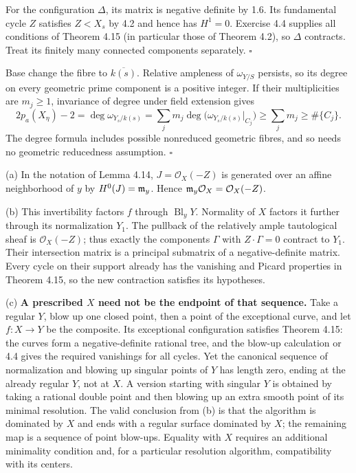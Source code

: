 \documentclass[11pt]{article}
\let\chapterexercise\exercise
\renewcommand{\exercise}[2]{\Needspace{8\baselineskip}\chapterexercise{#1}{#2}}
\begin{document}
For the configuration $\Delta$, its matrix is negative definite by 1.6. Its fundamental cycle $Z$ satisfies $Z<X_s$ by 4.2 and hence has $H^1=0$. Exercise 4.4 supplies all conditions of Theorem 4.15 (in particular those of Theorem 4.2), so $\Delta$ contracts. Treat its finitely many connected components separately. \hfill$\square$

\pf Base change the fibre to $\overline{k(s)}$. Relative ampleness of $\omega_{Y/S}$ persists, so its degree on every geometric prime component is a positive integer. If their multiplicities are $m_j\ge1$, invariance of degree under field extension gives
\[ 2p_a(X_\eta)-2=\deg\omega_{Y_s/k(s)}
=\sum_jm_j\deg\bigl(\omega_{Y_s/k(s)}|_{C_j}\bigr)\ge\sum_jm_j\ge\#\{C_j\}. \]
The degree formula includes possible nonreduced geometric fibres, and so needs no geometric reducedness assumption. \hfill$\square$

\pf (a) In the notation of Lemma 4.14, $J=\mathcal O_X(-Z)$ is generated over an affine neighborhood of $y$ by $H^0(J)=\mathfrak m_y$. Hence $\mathfrak m_y\mathcal O_X=\mathcal O_X(-Z)$.

(b) This invertibility factors $f$ through $\operatorname{Bl}_yY$. Normality of $X$ factors it further through its normalization $Y_1$. The pullback of the relatively ample tautological sheaf is $\mathcal O_X(-Z)$; thus exactly the components $\Gamma$ with $Z\cdot\Gamma=0$ contract to $Y_1$. Their intersection matrix is a principal submatrix of a negative-definite matrix. Every cycle on their support already has the vanishing and Picard properties in Theorem 4.15, so the new contraction satisfies its hypotheses.

(c) \textbf{A prescribed $X$ need not be the endpoint of that sequence.} Take a regular $Y$, blow up one closed point, then a point of the exceptional curve, and let $f:X\to Y$ be the composite. Its exceptional configuration satisfies Theorem 4.15: the curves form a negative-definite rational tree, and the blow-up calculation or 4.4 gives the required vanishings for all cycles. Yet the canonical sequence of normalization and blowing up singular points of $Y$ has length zero, ending at the already regular $Y$, not at $X$. A version starting with singular $Y$ is obtained by taking a rational double point and then blowing up an extra smooth point of its minimal resolution. The valid conclusion from (b) is that the algorithm is dominated by $X$ and ends with a regular surface dominated by $X$; the remaining map is a sequence of point blow-ups. Equality with $X$ requires an additional minimality condition and, for a particular resolution algorithm, compatibility with its centers.
\end{document}
